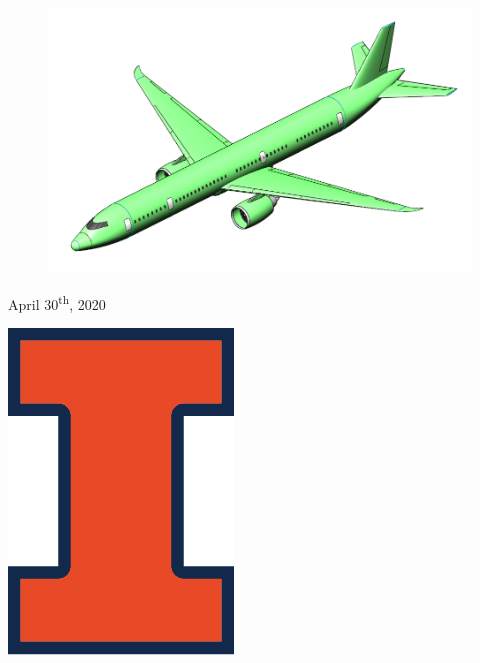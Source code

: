 \begin{titlepage}
	
        \begin{figure}[H]
            \centering
            \includegraphics[width=0.98\linewidth]{Photos/Toucan SAM Mk. I Isometric FDR.jpeg}
            \label{figISO}
        \end{figure}
	
	\vfill\vfill\vfill %
	
	{\large April 30\textsuperscript{th}, 2020} %
	
	
	\vfill\vfill
	\begin{minipage}{\linewidth}
		\begin{flushright}
	        \includegraphics[scale=0.5]{Photos/Illinois-Logo-Full-Color-RGB.png}\\[1cm]
		\end{flushright}
	\end{minipage}
	 

\end{titlepage}
